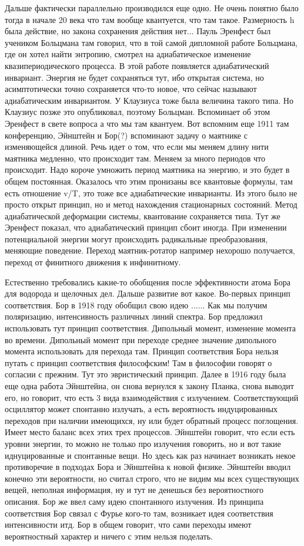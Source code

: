 \documentclass[a4paper, 12pt]{article}
\begin{document}
Дальше фактически параллельно производился еще одно. Не очень понятно 
было тогда в начале 20 века что там вообще квантуется, что там такое. 
Размерность h была действие, но закона сохранения действия нет... Пауль 
Эренфест был учеником Больцмана там говорил, что в той самой дипломной 
работе Больцмана, где он хотел найти энтропию, смотрел на адиабатическое 
изменение квазипериодического процесса. В этой работе появляется 
адиабатический инвариант. Энергия не будет сохраняться тут, ибо открытая 
система, но асимптотически точно сохраняется что-то новое, что сейчас 
называют адиабатическим инвариантом. У Клаузиуса тоже была величина 
такого типа. Но Клаузиус позже это опубликовал, поэтому Больцман. 
Вспоминает об этом Эренфест в свете вопроса а что мы там квантуем. Вот 
вспомним еще 1911 там конференцию, Эйнштейн и Бор(?) вспоминают задачу 
о маятнике с изменяющейся длиной. Речь идет о том, что если мы меняем 
длину нити маятника медленно, что происходит там. Меняем за много 
периодов что происходит. Надо короче умножить период маятника на 
энергию, и это будет в общем постоянная. Оказалось что этим пронизаны 
все квантовые формулы, там есть отношение v/T, это тоже все 
адиабатические инварианты. Из этого было не просто открыт принцип, но 
и метод нахождения стационарных состояний. Метод адиабатической 
деформации системы, квантование сохраняется типа. Тут же Эренфест 
показал, что адиабатический принцип сбоит иногда. При изменении 
потенциальной энергии могут происходить радикальные преобразования, 
меняющие поведение. Переход маятник-ротатор например нехорошо 
получается, переход от финитного движения к инфинитному.

Естественно требовались какие-то обобщения после эффективности атома 
Бора для водорода и щелочных дел. Дальше развитие вот какое. Во-первых 
принцип соответствия. Бор в 1918 году обобщил свою идею ...... Как мы 
получим поляризацию, интенсивность различных линий спектра. Бор 
предложил использовать тут принцип соответствия. Дипольный момент, 
изменение момента во времени. Дипольный момент при переходе среднее 
значение дипольного момента использовать для перехода там. Принцип 
соответствия Бора нельзя путать с принцип соответствия философским! Там 
в философии говорят о согласии с прежним. Тут это эвристический принцип. 
Далее в 1916 году была еще одна работа Эйнштейна, он снова вернулся 
к закону Планка, снова выводит его, но говорит, что есть 3 вида 
взаимодействия с излучением. Соответствующий осциллятор может спонтанно 
излучать, а есть вероятность индуцированных переходов при наличии 
имеющихся, ну или будет обратный процесс поглощения. Имеет место баланс 
всех этих трех процессов. Эйнштейн говорит, что если есть уровни 
энергии, то можно не только про излучения говорить, но и вот такие 
иднуцированные и спонтанные вещи. Но здесь как раз начинает возникать 
некое противоречие в подходах Бора и Эйнштейна к новой физике. Эйнштейн 
вводил конечно эти вероятности, но считал строго, что не видим мы всех 
существующих вещей, неполная информация, ну и тут не денешься без 
вероятностного описания. Бор же ввел саму идею спонтанного излучения. Из 
принципа соответствия Бор связал с Фурье кого-то там, возникает идея 
соответствия интенсивности итд. Бор в общем говорит, что сами переходы 
имеют вероятностный характер и ничего с этим нельзя поделать.
\end{document}
